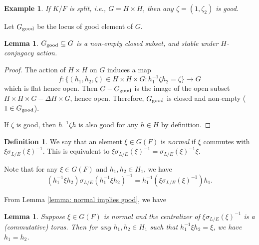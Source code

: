\documentclass[11pt, reqno]{amsart}
\numberwithin{equation}{subsection}
\theoremstyle{plain}
\newtheorem{lem}[proposition]{Lemma}
\newtheorem{example}[proposition]{Example}
\theoremstyle{definition}
\newtheorem{definition}[proposition]{Definition}
\newcommand{\good}{\textnormal{good}}
\begin{document}
\begin{example}
If $K/F$ is split, i.e., $G=H \times H$, then any $\zeta=(1,\zeta_2)$ is good.
\end{example}

Let $G_{\good}$ be the locus of good element of $G$.

\begin{lem}
$G_{\good} \subseteq G$ is a non-empty closed subset, and stable under $H$-conjugacy action.   
\end{lem}
\begin{proof}
The action of $H \times H$ on $G$ induces a map
$$
f: \{ (h_1,h_2, \zeta) \in H \times H \times G : h_1^{-1}\zeta h_2=\zeta \} \to G
$$
which is flat hence open. Then $G - G_{\good}$ is the image of the open subset $H \times H \times G - \Delta H \times G$, hence open. Therefore, $G_{\good}$ is closed and non-empty ($1 \in G_{\good}$).

If $\zeta$ is good, then $h^{-1}\zeta h$ is also good for any $h \in H$ by definition.
\end{proof}

\begin{definition}
\label{def:normalgeneral}
We say that an element $\xi \in G(F)$ is
\emph{normal} if $\xi$ commutes with $\xi\sigma_{L/E}(\xi)^{-1}$.
This is equivalent to $\xi\sigma_{L/E}(\xi)^{-1} = \sigma_{L/E}(\xi)^{-1}\xi$.
\end{definition}

Note that for any $\xi \in G(F)$ and $h_1, h_2 \in H_1$,
we have
\begin{equation}
\label{eq:norm}
    (h_1^{-1}\xi h_2)\sigma_{L/E}(h_1^{-1}\xi h_2)^{-1}
    = h_1^{-1}(\xi \sigma_{L/E}(\xi)^{-1}) h_1.
\end{equation}

From Lemma \ref{lemma: normal implies good}, we have

\begin{lem}
\label{lem:normalgeneral}
Suppose $\xi \in G(F)$ is normal and the centralizer
of $\xi\sigma_{L/E}(\xi)^{-1}$ is a (commutative) torus.
Then for any $h_1, h_2 \in H_1$ such
that $h_1^{-1}\xi h_2 = \xi$, we have $h_1 = h_2$. 
\end{lem}
\end{document}
